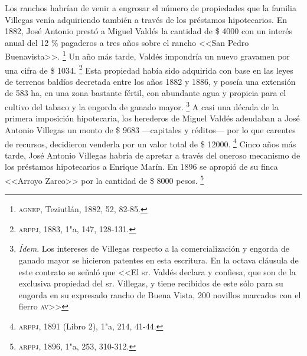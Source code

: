 \documentclass[14pt,twoside,final]{extbook} %
\let\oldfootnote\footnote
\renewcommand\footnote[1]{%
\oldfootnote{\hspace{1mm}#1}}
\begin{document}
Los ranchos habrían de venir a engrosar el número de propiedades que la familia Villegas venía adquiriendo también a través de los préstamos hipotecarios. En 1882, José Antonio prestó a Miguel Valdés la cantidad de \$ 4000 con un interés anual del 12 \% pagaderos a tres años sobre el rancho <<San Pedro Buenavista>>.\footnote{\textsc{agnep}, Teziutlán, 1882, 52, 82-85.} Un año más tarde, Valdés impondría un nuevo gravamen por una cifra de \$ 1034.\footnote{\textsc{arppj}, 1883, 1"a, 147, 128-131.} Esta propiedad había sido adquirida con base en las leyes de terrenos baldíos decretada entre los años 1882 y 1886, y poseía una extensión de 583 ha, en una zona bastante fértil, con abundante agua y propicia para el cultivo del tabaco y la engorda de ganado mayor.\footnote{\emph{Ídem}. Los intereses de Villegas respecto a la comercialización y engorda de ganado mayor se hicieron patentes en esta escritura. En la octava cláusula de este contrato se señaló que <<El sr. Valdés declara y confiesa, que son de la exclusiva propiedad del sr. Villegas, y tiene recibidos de este sólo para su engorda en su expresado rancho de Buena Vista, 200 novillos marcados con el fierro \textsc{av}>>} A casi una década de la primera imposición hipotecaria, los herederos de
Miguel Valdés adeudaban a José Antonio Villegas un monto de \$ 9683 ---capitales
y réditos--- por lo que carentes de recursos, decidieron venderla por un valor total de \$ 12000.\footnote{\textsc{arppj}, 1891 (Libro 2), 1"a, 214, 41-44.} Cinco años más tarde, José Antonio Villegas habría de apretar a través del oneroso mecanismo de los préstamos hipotecarios a Enrique Marín. En 1896 se apropió de su finca <<Arroyo Zarco>> por la cantidad de \$ 8000 pesos.\footnote{\textsc{arppj}, 1896, 1"a, 253, 310-312.}
\end{document}
